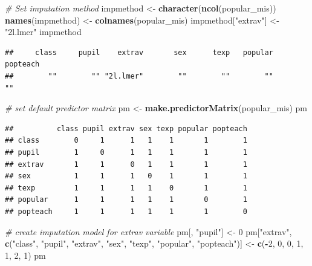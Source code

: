 \documentclass[
]{book}
\newenvironment{Shaded}{\begin{snugshade}}{\end{snugshade}}
\newcommand{\CommentTok}[1]{\textcolor[rgb]{0.56,0.35,0.01}{\textit{#1}}}
\newcommand{\DecValTok}[1]{\textcolor[rgb]{0.00,0.00,0.81}{#1}}
\newcommand{\KeywordTok}[1]{\textcolor[rgb]{0.13,0.29,0.53}{\textbf{#1}}}
\newcommand{\NormalTok}[1]{#1}
\newcommand{\OperatorTok}[1]{\textcolor[rgb]{0.81,0.36,0.00}{\textbf{#1}}}
\newcommand{\StringTok}[1]{\textcolor[rgb]{0.31,0.60,0.02}{#1}}
\begin{document}
\begin{Shaded}
\begin{Highlighting}[]
\CommentTok{# Set imputation method}
\NormalTok{impmethod <-}\StringTok{ }\KeywordTok{character}\NormalTok{(}\KeywordTok{ncol}\NormalTok{(popular_mis))}
\KeywordTok{names}\NormalTok{(impmethod) <-}\StringTok{ }\KeywordTok{colnames}\NormalTok{(popular_mis)}
\NormalTok{impmethod[}\StringTok{"extrav"}\NormalTok{] <-}\StringTok{ "2l.lmer"}
\NormalTok{impmethod}
\end{Highlighting}
\end{Shaded}

\begin{verbatim}
##     class     pupil    extrav       sex      texp   popular  popteach 
##        ""        "" "2l.lmer"        ""        ""        ""        ""
\end{verbatim}

\begin{Shaded}
\begin{Highlighting}[]
\CommentTok{# set default predictor matrix}
\NormalTok{pm <-}\StringTok{ }\KeywordTok{make.predictorMatrix}\NormalTok{(popular_mis)}
\NormalTok{pm}
\end{Highlighting}
\end{Shaded}

\begin{verbatim}
##          class pupil extrav sex texp popular popteach
## class        0     1      1   1    1       1        1
## pupil        1     0      1   1    1       1        1
## extrav       1     1      0   1    1       1        1
## sex          1     1      1   0    1       1        1
## texp         1     1      1   1    0       1        1
## popular      1     1      1   1    1       0        1
## popteach     1     1      1   1    1       1        0
\end{verbatim}

\begin{Shaded}
\begin{Highlighting}[]
\CommentTok{# create imputation model for extrav variable}
\NormalTok{pm[, }\StringTok{"pupil"}\NormalTok{] <-}\StringTok{ }\DecValTok{0}
\NormalTok{pm[}\StringTok{"extrav"}\NormalTok{, }\KeywordTok{c}\NormalTok{(}\StringTok{"class"}\NormalTok{, }\StringTok{"pupil"}\NormalTok{, }\StringTok{"extrav"}\NormalTok{, }\StringTok{"sex"}\NormalTok{, }\StringTok{"texp"}\NormalTok{, }\StringTok{"popular"}\NormalTok{, }\StringTok{"popteach"}\NormalTok{)] <-}\StringTok{ }\KeywordTok{c}\NormalTok{(}\OperatorTok{-}\DecValTok{2}\NormalTok{, }\DecValTok{0}\NormalTok{, }\DecValTok{0}\NormalTok{, }\DecValTok{1}\NormalTok{, }\DecValTok{1}\NormalTok{, }\DecValTok{2}\NormalTok{, }\DecValTok{1}\NormalTok{)}
\NormalTok{pm}
\end{Highlighting}
\end{Shaded}
\end{document}
